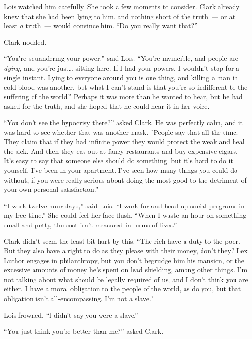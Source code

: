 \documentclass[ebook,12pt]{memoir}
\begin{document}
Lois watched him carefully. She took a few moments to consider. Clark
already knew that she had been lying to him, and nothing short of the
truth~--- or at least \emph{a} truth~--- would convince him. ``Do you
really want that?''

Clark nodded.

``You're squandering your power,'' said Lois. ``You're invincible, and
people are \emph{dying}, and you're just\ldots{} sitting here. If I had
your powers, I wouldn't stop for a single instant. Lying to everyone
around you is one thing, and killing a man in cold blood was another,
but what I can't stand is that you're so indifferent to the suffering of
the world.'' Perhaps it was more than he wanted to hear, but he had
asked for the truth, and she hoped that he could hear it in her voice.

``You don't see the hypocrisy there?'' asked Clark. He was perfectly
calm, and it was hard to see whether that was another mask. ``People say
that all the time. They claim that if they had infinite power they would
protect the weak and heal the sick. And then they eat out at fancy
restaurants and buy expensive cigars. It's easy to say that someone else
should do something, but it's hard to do it yourself. I've been in your
apartment. I've seen how many things you could do without, if you were
really serious about doing the most good to the detriment of your own
personal satisfaction.''

``I work twelve hour days,'' said Lois. ``I work for and head up social
programs in my free time.'' She could feel her face flush. ``When I
waste an hour on something small and petty, the cost isn't measured in
terms of lives.''

Clark didn't seem the least bit hurt by this. ``The rich have a duty to
the poor. But they also have a right to do as they please with their
money, don't they? Lex Luthor engages in philanthropy, but you don't
begrudge him his mansion, or the excessive amounts of money he's spent
on lead shielding, among other things. I'm not talking about what should
be legally required of us, and I don't think you are either. I have a
moral obligation to the people of the world, as do you, but that
obligation isn't all‐encompassing. I'm not a slave.''

Lois frowned. ``I didn't say you were a slave.''

``You just think you're better than me?'' asked Clark.
\end{document}

